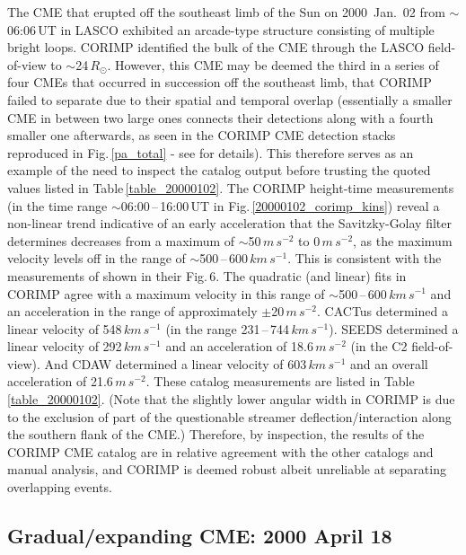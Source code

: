 \documentclass[referee,a4paper,12pt,traditabstract]{swsc}
\begin{document}
\begin{linenumbers}
The CME that erupted off the southeast limb of the Sun on 2000~Jan.~02 from $\sim$06:06\,UT in LASCO exhibited an arcade-type structure consisting of multiple bright loops. CORIMP identified the bulk of the CME through the LASCO field-of-view to $\sim$24\,$R_\odot$. However, this CME may be deemed the third in a series of four CMEs that occurred in succession off the southeast limb, that CORIMP failed to separate due to their spatial and temporal overlap (essentially a smaller CME in between two large ones connects their detections along with a fourth smaller one afterwards, as seen in the CORIMP CME detection stacks reproduced in Fig.\,\ref{pa_total} - see \citealt{2012ApJ...752..145B} for details). This therefore serves as an example of the need to inspect the catalog output before trusting the quoted values listed in Table\,\ref{table_20000102}. The CORIMP height-time measurements (in the time range $\sim$06:00\,--\,16:00\,UT in Fig.\,\ref{20000102_corimp_kins}) reveal a non-linear trend indicative of an early acceleration that the Savitzky-Golay filter determines decreases from a maximum of $\sim$50\,$m\,s^{-2}$ to 0\,$m\,s^{-2}$, as the maximum velocity levels off in the range of $\sim$500\,--\,600\,$km\,s^{-1}$. This is consistent with the measurements of \cite{2009A&A...495..325B} shown in their Fig.\,6. The quadratic (and linear) fits in CORIMP agree with a maximum velocity in this range of $\sim$500\,--\,600\,$km\,s^{-1}$ and an acceleration in the range of approximately $\pm$20\,$m\,s^{-2}$. CACTus determined a linear velocity of 548\,$km\,s^{-1}$ (in the range 231\,--\,744\,$km\,s^{-1}$). SEEDS determined a linear velocity of 292\,$km\,s^{-1}$ and an acceleration of 18.6\,$m\,s^{-2}$ (in the C2 field-of-view). And CDAW determined a linear velocity of 603\,$km\,s^{-1}$ and an overall acceleration of 21.6\,$m\,s^{-2}$. These catalog measurements are listed in Table\,\ref{table_20000102}. (Note that the slightly lower angular width in CORIMP is due to the exclusion of part of the questionable streamer deflection/interaction along the southern flank of the CME.) Therefore, by inspection, the results of the CORIMP CME catalog are in relative agreement with the other catalogs and manual analysis, and CORIMP is deemed robust albeit unreliable at separating overlapping events.


\subsection{Gradual/expanding CME: 2000 April 18}



\end{linenumbers}
\end{document}
